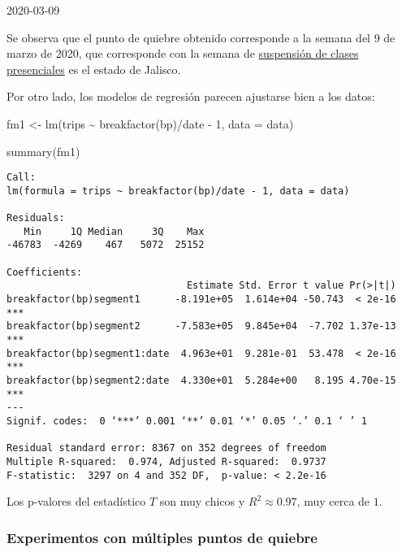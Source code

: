 \documentclass[
]{article}
\newenvironment{Shaded}{}{}
\newcommand{\AttributeTok}[1]{\textcolor[rgb]{0.49,0.56,0.16}{#1}}
\newcommand{\DecValTok}[1]{\textcolor[rgb]{0.25,0.63,0.44}{#1}}
\newcommand{\FunctionTok}[1]{\textcolor[rgb]{0.02,0.16,0.49}{#1}}
\newcommand{\NormalTok}[1]{#1}
\newcommand{\OtherTok}[1]{\textcolor[rgb]{0.00,0.44,0.13}{#1}}
\newcommand{\SpecialCharTok}[1]{\textcolor[rgb]{0.25,0.44,0.63}{#1}}
\begin{document}
2020-03-09

Se observa que el punto de quiebre obtenido corresponde a la semana del
9 de marzo de 2020, que corresponde con la semana de
\href{https://www.animalpolitico.com/2020/03/jalisco-suspende-clases-universidades-eventos-masivos-coronavirus/}{suspensión
de clases presenciales} es el estado de Jalisco.

Por otro lado, los modelos de regresión parecen ajustarse bien a los
datos:

\begin{Shaded}
\begin{Highlighting}[]
\NormalTok{fm1 }\OtherTok{\textless{}{-}} \FunctionTok{lm}\NormalTok{(trips }\SpecialCharTok{\textasciitilde{}} \FunctionTok{breakfactor}\NormalTok{(bp)}\SpecialCharTok{/}\NormalTok{date }\SpecialCharTok{{-}} \DecValTok{1}\NormalTok{, }\AttributeTok{data =}\NormalTok{ data)}
\end{Highlighting}
\end{Shaded}

\begin{Shaded}
\begin{Highlighting}[]
\FunctionTok{summary}\NormalTok{(fm1)}
\end{Highlighting}
\end{Shaded}

\begin{verbatim}
Call:
lm(formula = trips ~ breakfactor(bp)/date - 1, data = data)

Residuals:
   Min     1Q Median     3Q    Max
-46783  -4269    467   5072  25152

Coefficients:
                               Estimate Std. Error t value Pr(>|t|)
breakfactor(bp)segment1      -8.191e+05  1.614e+04 -50.743  < 2e-16 ***
breakfactor(bp)segment2      -7.583e+05  9.845e+04  -7.702 1.37e-13 ***
breakfactor(bp)segment1:date  4.963e+01  9.281e-01  53.478  < 2e-16 ***
breakfactor(bp)segment2:date  4.330e+01  5.284e+00   8.195 4.70e-15 ***
---
Signif. codes:  0 ‘***’ 0.001 ‘**’ 0.01 ‘*’ 0.05 ‘.’ 0.1 ‘ ’ 1

Residual standard error: 8367 on 352 degrees of freedom
Multiple R-squared:  0.974,	Adjusted R-squared:  0.9737
F-statistic:  3297 on 4 and 352 DF,  p-value: < 2.2e-16
\end{verbatim}

Los p-valores del estadístico \(T\) son muy chicos y
\(R^2 \approx 0.97\), muy cerca de \(1\).

\hypertarget{experimentos-con-muxfaltiples-puntos-de-quiebre}{%
\subsubsection{Experimentos con múltiples puntos de
quiebre}\label{experimentos-con-muxfaltiples-puntos-de-quiebre}}
\end{document}
